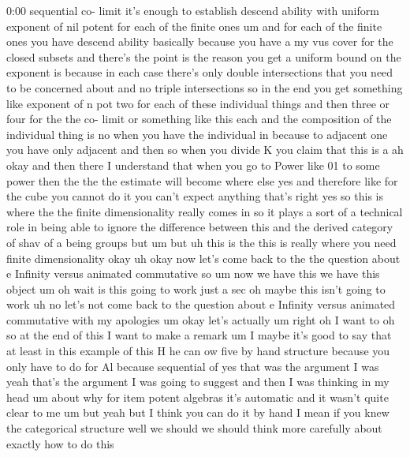 \begin{unfinished}{0:00}
sequential  co-  limit  it's  enough  to
establish  descend  ability  with  uniform
exponent  of  nil  potent  for  each  of  the
finite
ones  um  and  for  each  of  the  finite  ones
you  have  descend  ability  basically
because  you  have  a  my  vus  cover  for  the
closed  subsets  and  there's  the  point  is
the  reason  you  get  a  uniform  bound  on
the  exponent  is  because  in  each  case
there's  only  double  intersections  that
you  need  to  be  concerned  about  and  no
triple  intersections  so  in  the  end  you
get  something  like  exponent  of  n  pot  two
for  each  of  these  individual  things  and
then  three  or  four  for  the  the  co-  limit
or  something  like  this  each  and  the
composition  of  the  individual  thing
is  no  when  you  have  the  individual  in
because  to  adjacent  one  you  have  only
adjacent  and  then  so  when  you  divide  K
you  claim  that  this  is
a  ah  okay  and  then  there  I  understand
that  when  you  go  to  Power  like  01  to
some  power  then  the  the  the  estimate
will  become  where  else  yes  and  therefore
like  for  the  cube  you  cannot  do  it  you
can't  expect  anything  that's  right  yes
so  this  is  where  the  the  finite
dimensionality  really  comes  in  so  it
plays  a  sort  of  a  technical  role  in
being  able  to  ignore  the  difference
between  this  and  the  derived  category  of
shav  of  a  being  groups  but  um  but  uh
this  is  the  this  is  really  where  you
need  finite
dimensionality
okay  uh  okay  now  let's  come  back  to  the
the  question  about  e  Infinity  versus
animated  commutative  so  um  now  we  have
this  we  have  this  object
um  oh  wait  is  this  going  to  work  just  a
sec  oh  maybe  this  isn't  going  to  work  uh
no  let's  not  come  back  to  the  question
about  e  Infinity  versus  animated
commutative  with  my
apologies
um  okay  let's
actually
um  right  oh  I  want  to  oh  so  at  the  end
of  this  I  want  to  make  a
remark
um  I  maybe  it's  good  to  say  that  at
least  in  this  example  of  this  H  he  can
ow  five  by  hand
structure  because  you  only  have  to  do
for  Al  because  sequential
of  yes  that  was  the  argument  I  was  yeah
that's  the  argument  I  was  going  to
suggest  and  then  I  was  thinking  in  my
head  um  about  why  for  item  potent
algebras  it's  automatic  and  it  wasn't
quite  clear  to  me  um  but  yeah  but  I
think  you  can  do  it  by  hand  I  mean  if
you  knew  the  categorical  structure  well
we  should  we  should  think  more  carefully
about  exactly  how  to  do  this

\end{unfinished}
